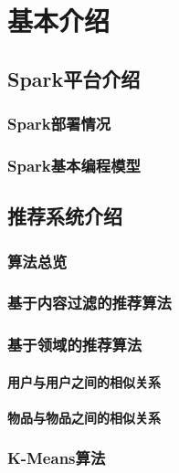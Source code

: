 \chapter{基本介绍}
\section{Spark平台介绍}
\subsection{Spark部署情况}
\subsection{Spark基本编程模型}

\section{推荐系统介绍}
\subsection{算法总览}
\subsection{基于内容过滤的推荐算法}
\subsection{基于领域的推荐算法}
\subsubsection{用户与用户之间的相似关系}
\subsubsection{物品与物品之间的相似关系}
\subsection{K-Means算法}
